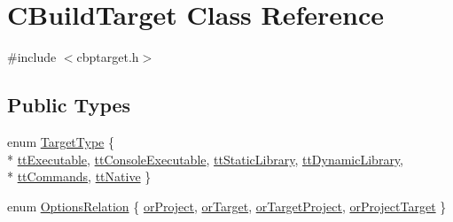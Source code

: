 \hypertarget{classCBuildTarget}{\section{C\-Build\-Target Class Reference}
\label{classCBuildTarget}
}


{\ttfamily \#include $<$cbptarget.\-h$>$}

\subsection*{Public Types}
\begin{DoxyCompactItemize}
\item 
enum \hyperlink{classCBuildTarget_ae920f5ba8e1975bafff70b8b30c449b5}{Target\-Type} \{ \\*
\hyperlink{classCBuildTarget_ae920f5ba8e1975bafff70b8b30c449b5a2f28239e2aa020ac7b599abfd8cb80ed}{tt\-Executable}, 
\hyperlink{classCBuildTarget_ae920f5ba8e1975bafff70b8b30c449b5a2cec686fb122a44a2c4bf79a2fadd7c6}{tt\-Console\-Executable}, 
\hyperlink{classCBuildTarget_ae920f5ba8e1975bafff70b8b30c449b5a0f87b6b58d86a799d1d8bd570ecc74d2}{tt\-Static\-Library}, 
\hyperlink{classCBuildTarget_ae920f5ba8e1975bafff70b8b30c449b5a946ebe00dc38daf8c11dfdeb3a1fda7e}{tt\-Dynamic\-Library}, 
\\*
\hyperlink{classCBuildTarget_ae920f5ba8e1975bafff70b8b30c449b5ae3df2a57236e2f98f3f9c0c5ce631a80}{tt\-Commands}, 
\hyperlink{classCBuildTarget_ae920f5ba8e1975bafff70b8b30c449b5a023882bf682aef975e3f1f8283f51746}{tt\-Native}
 \}
\item 
enum \hyperlink{classCBuildTarget_a65a8d160e9cb9cc5632373836e0adb9e}{Options\-Relation} \{ \hyperlink{classCBuildTarget_a65a8d160e9cb9cc5632373836e0adb9ea8dbc1b5fb7384bcacc5453576eb53e9c}{or\-Project}, 
\hyperlink{classCBuildTarget_a65a8d160e9cb9cc5632373836e0adb9ea8f001181cd9f7aaa76e8915b27bef01a}{or\-Target}, 
\hyperlink{classCBuildTarget_a65a8d160e9cb9cc5632373836e0adb9eaee0e19bc748d10d35c664671fc5547a6}{or\-Target\-Project}, 
\hyperlink{classCBuildTarget_a65a8d160e9cb9cc5632373836e0adb9ea7ca6ec2ac0853a0516a4638cd2aaf391}{or\-Project\-Target}
 \}
\end{DoxyCompactItemize}
